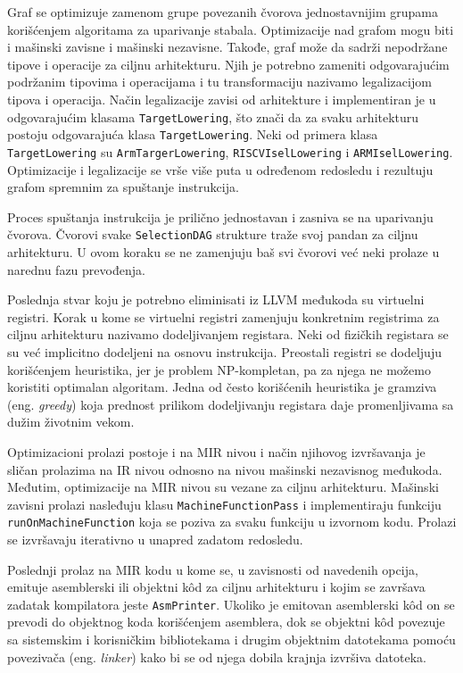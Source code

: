 \documentclass[12pt,oneside]{memoir}
\begin{document}
Graf se optimizuje zamenom grupe povezanih čvorova jednostavnijim grupama korišćenjem algoritama za uparivanje stabala. Optimizacije nad grafom mogu biti i mašinski zavisne i mašinski nezavisne. Takođe, graf može da sadrži nepodržane tipove i operacije za ciljnu arhitekturu. Njih je potrebno zameniti odgovarajućim podržanim tipovima i operacijama i tu transformaciju nazivamo legalizacijom tipova i operacija. Način legalizacije zavisi od arhitekture i implementiran je u odgovarajućim klasama \texttt{TargetLowering}, što znači da za svaku arhitekturu postoju odgovarajuća klasa \texttt{TargetLowering}. Neki od primera klasa \texttt{TargetLowering} su \texttt{ArmTargerLowering}, \texttt{RISCVIselLowering} i \texttt{ARMIselLowering}. Optimizacije i legalizacije se vrše više puta u određenom redosledu i rezultuju grafom spremnim za spuštanje
instrukcija. 

Proces spuštanja instrukcija je prilično jednostavan i zasniva se na uparivanju čvorova. Čvorovi svake \texttt{SelectionDAG} strukture traže svoj pandan za ciljnu arhitekturu. U ovom koraku se ne zamenjuju baš svi čvorovi već neki prolaze u narednu fazu prevođenja.

Poslednja stvar koju je potrebno eliminisati iz LLVM međukoda su virtuelni registri. Korak u kome se virtuelni registri zamenjuju konkretnim registrima za ciljnu arhitekturu nazivamo dodeljivanjem registara. Neki od fizičkih registara se su već implicitno dodeljeni na osnovu instrukcija. Preostali registri se dodeljuju korišćenjem heuristika, jer je problem NP-kompletan, pa za njega ne možemo koristiti optimalan algoritam. Jedna od često korišćenih heuristika je gramziva (eng. \textit{greedy}) koja prednost prilikom dodeljivanju registara daje promenljivama sa dužim životnim vekom. 

Optimizacioni prolazi postoje i na MIR nivou i način njihovog izvršavanja je sličan prolazima na IR nivou odnosno na nivou mašinski nezavisnog međukoda. Međutim, optimizacije na MIR nivou su vezane za ciljnu arhitekturu. Mašinski zavisni prolazi nasleđuju klasu \texttt{MachineFunctionPass} i implementiraju funkciju \texttt{runOnMachineFunction} koja se poziva za svaku funkciju u izvornom kodu. Prolazi se izvršavaju iterativno u unapred zadatom redosledu.

Poslednji prolaz na MIR kodu u kome se, u zavisnosti od navedenih opcija, emituje asemblerski ili objektni k\^od za ciljnu arhitekturu i kojim se završava zadatak kompilatora jeste \texttt{AsmPrinter}. Ukoliko je emitovan asemblerski k\^od on se prevodi do objektnog koda korišćenjem asemblera, dok se objektni kôd povezuje sa sistemskim i korisničkim bibliotekama i drugim objektnim datotekama pomoću povezivača (eng. \textit{linker}) kako bi se od njega dobila krajnja izvršiva datoteka.
\end{document}
